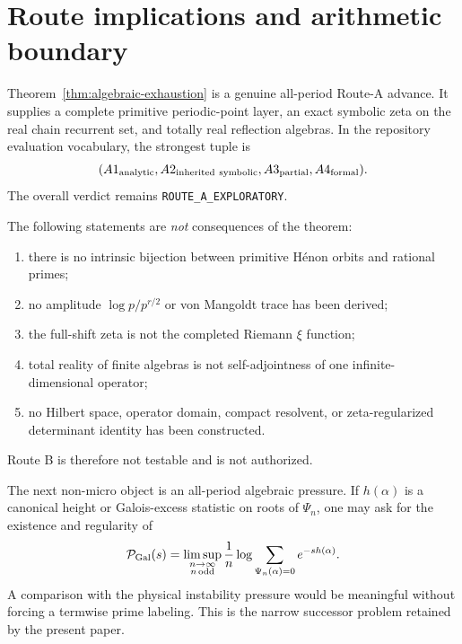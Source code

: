 \section{Route implications and arithmetic boundary}\label{sec:boundary}

Theorem~\ref{thm:algebraic-exhaustion} is a genuine all-period Route-A
advance.  It supplies a complete primitive periodic-point layer, an exact
symbolic zeta on the real chain recurrent set, and totally real reflection
algebras.  In the repository evaluation vocabulary, the strongest tuple is
\[
(A1_{\rm analytic},A2_{\rm inherited\ symbolic},
 A3_{\rm partial},A4_{\rm formal}).
\]
The overall verdict remains \texttt{ROUTE\_A\_EXPLORATORY}.

The following statements are \emph{not} consequences of the theorem:
\begin{enumerate}
\item there is no intrinsic bijection between primitive H\'enon orbits and
rational primes;
\item no amplitude $\log p/p^{r/2}$ or von Mangoldt trace has been derived;
\item the full-shift zeta is not the completed Riemann $\xi$ function;
\item total reality of finite algebras is not self-adjointness of one
infinite-dimensional operator;
\item no Hilbert space, operator domain, compact resolvent, or zeta-regularized
determinant identity has been constructed.
\end{enumerate}
Route B is therefore not testable and is not authorized.

The next non-micro object is an all-period algebraic pressure.  If
$h(\alpha)$ is a canonical height or Galois-excess statistic on roots of
$\Psi_n$, one may ask for the existence and regularity of
\[
\mathcal P_{\rm Gal}(s)
=\limsup_{\substack{n\to\infty\\ n\,\mathrm{odd}}}
\frac1n\log\sum_{\Psi_n(\alpha)=0}e^{-s h(\alpha)}.
\]
A comparison with the physical instability pressure would be meaningful
without forcing a termwise prime labeling.  This is the narrow successor
problem retained by the present paper.
